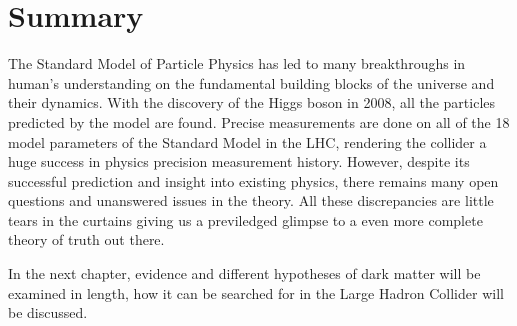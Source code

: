 \section{Summary}
The Standard Model of Particle Physics has led to many breakthroughs in human's understanding on the fundamental building blocks of the universe and their dynamics. With the discovery of the Higgs boson in 2008, all the particles predicted by the model are found. Precise measurements are done on all of the 18 model parameters of the Standard Model in the LHC, rendering the collider a huge success in physics precision measurement history. However, despite its successful prediction and insight into existing physics, there remains many open questions and unanswered issues in the theory. All these discrepancies are little tears in the curtains giving us a previledged glimpse to a even more complete theory of truth out there.

In the next chapter, evidence and different hypotheses of dark matter will be examined in length, how it can be searched for in the Large Hadron Collider will be discussed. 



%



